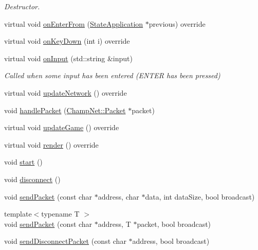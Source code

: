 \begin{DoxyCompactItemize}
\begin{DoxyCompactList}\small\item\em Destructor. \end{DoxyCompactList}\item 
virtual void \hyperlink{class_state_server_ae1517f9d264d1fb39c16512477caa83e}{on\-Enter\-From} (\hyperlink{class_state_application}{State\-Application} $\ast$previous) override
\item 
virtual void \hyperlink{class_state_server_a69b988594b45275a55bcb7ba5ceb7aeb}{on\-Key\-Down} (int i) override
\item 
virtual void \hyperlink{class_state_server_a680525d2a1036dbbefaf21a7057fb39e}{on\-Input} (std\-::string \&input)
\begin{DoxyCompactList}\small\item\em Called when some input has been entered (E\-N\-T\-E\-R has been pressed) \end{DoxyCompactList}\item 
virtual void \hyperlink{class_state_server_aceb9a260a5c4a4d46607e8fe71be2667}{update\-Network} () override
\item 
void \hyperlink{class_state_server_a8983232b9935b74fda71ed409b45c7fd}{handle\-Packet} (\hyperlink{class_champ_net_1_1_packet}{Champ\-Net\-::\-Packet} $\ast$packet)
\item 
virtual void \hyperlink{class_state_server_afc726acef321e4fd0b9f3aeacb126845}{update\-Game} () override
\item 
virtual void \hyperlink{class_state_server_afb476eb4f969490b00944a93157b76c8}{render} () override
\item 
void \hyperlink{class_state_server_aaeb4f49e47304f186f87f79a3612b085}{start} ()
\item 
void \hyperlink{class_state_server_a066a1d342ca796d2f40d273dc375a032}{disconnect} ()
\item 
void \hyperlink{class_state_server_ab03b5fe855178bbfa7ec2741b7a08172}{send\-Packet} (const char $\ast$address, char $\ast$data, int data\-Size, bool broadcast)
\item 
{\footnotesize template$<$typename T $>$ }\\void \hyperlink{class_state_server_a88bda7a0bfd4878781f4676e3b4b19bd}{send\-Packet} (const char $\ast$address, T $\ast$packet, bool broadcast)
\item 
void \hyperlink{class_state_server_a4ba2a2bde5a70c0aa50ad936ca88ad44}{send\-Disconnect\-Packet} (const char $\ast$address, bool broadcast)
\item 

\end{DoxyCompactItemize}
